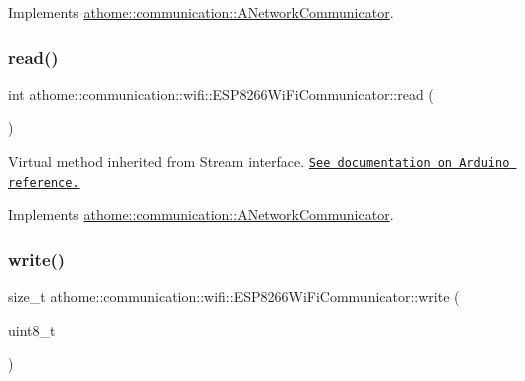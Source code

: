 Implements \mbox{\hyperlink{classathome_1_1communication_1_1_a_network_communicator_ad06ecdc94aa77b1bab934b85bed2ac7d}{athome\+::communication\+::\+A\+Network\+Communicator}}.

\mbox{\label{classathome_1_1communication_1_1wifi_1_1_e_s_p8266_wi_fi_communicator_a1cadc570e912c164279ef0ebc5b178a5}} 
\subsubsection{\texorpdfstring{read()}{read()}}
{\footnotesize\ttfamily int athome\+::communication\+::wifi\+::\+E\+S\+P8266\+Wi\+Fi\+Communicator\+::read (\begin{DoxyParamCaption}{ }\end{DoxyParamCaption})\hspace{0.3cm}{\ttfamily [virtual]}}

Virtual method inherited from Stream interface. \href{https://www.arduino.cc/reference/en/language/functions/communication/stream/streamread/}{\tt See documentation on Arduino reference.} 

Implements \mbox{\hyperlink{classathome_1_1communication_1_1_a_network_communicator_a88d3c4366daf48865ab48b22eb62d610}{athome\+::communication\+::\+A\+Network\+Communicator}}.

\mbox{\label{classathome_1_1communication_1_1wifi_1_1_e_s_p8266_wi_fi_communicator_afd3c1c4ce7d68717a7bb2cf1b9dc962f}} 
\subsubsection{\texorpdfstring{write()}{write()}}
{\footnotesize\ttfamily size\+\_\+t athome\+::communication\+::wifi\+::\+E\+S\+P8266\+Wi\+Fi\+Communicator\+::write (\begin{DoxyParamCaption}\item[{uint8\+\_\+t}]{ }\end{DoxyParamCaption})\hspace{0.3cm}{\ttfamily [virtual]}}

